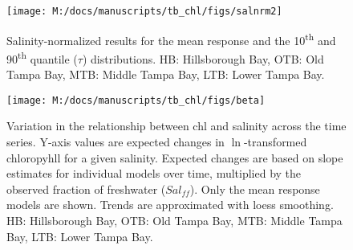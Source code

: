 \documentclass[letterpaper,12pt,oneside]{article}\usepackage{graphicx, color}
\begin{document}
\begin{landscape}
\centering\vspace*{\fill}
\begin{figure}[!ht]


{\centering \texttt{[image: M:/docs/manuscripts/tb\_chl/figs/salnrm2]} 

}

\caption[Salinity-normalized results for the mean response and the 10\textsuperscript{th} and 90\textsuperscript{th} quantile ($\tau$) distributions]{Salinity-normalized results for the mean response and the 10\textsuperscript{th} and 90\textsuperscript{th} quantile ($\tau$) distributions. HB: Hillsborough Bay, OTB: Old Tampa Bay, MTB: Middle Tampa Bay, LTB: Lower Tampa Bay.\label{fig:salnrm2}}
\end{figure}



\vfill
\end{landscape}

\begin{landscape}
\centering\vspace*{\fill}
\begin{figure}[!ht]


{\centering \texttt{[image: M:/docs/manuscripts/tb\_chl/figs/beta]} 

}

\caption[Variation in the relationship between \ac{chl} and salinity across the time series]{Variation in the relationship between \ac{chl} and salinity across the time series. Y-axis values are expected changes in $\ln$-transformed chloropyhll for a given salinity.  Expected changes are based on slope estimates for individual models over time, multiplied by the observed fraction of freshwater ($Sal_{ff}$).  Only the mean response models are shown.  Trends are approximated with loess smoothing. HB: Hillsborough Bay, OTB: Old Tampa Bay, MTB: Middle Tampa Bay, LTB: Lower Tampa Bay.\label{fig:beta}}
\end{figure}



\vfill
\end{landscape}
\end{document}
